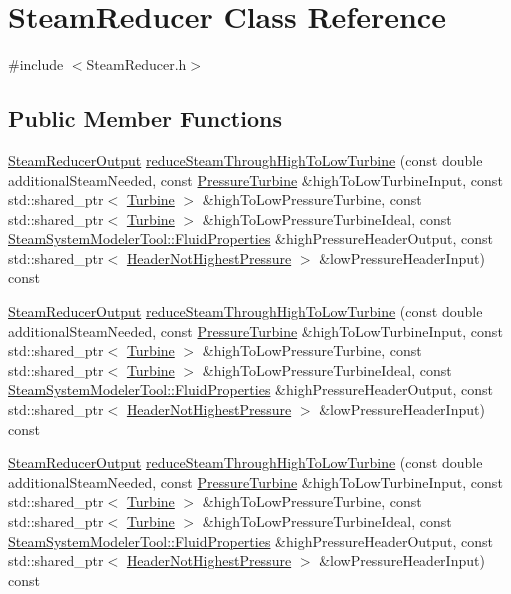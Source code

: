 \hypertarget{class_steam_reducer}{}\section{Steam\+Reducer Class Reference}
\label{class_steam_reducer}


{\ttfamily \#include $<$Steam\+Reducer.\+h$>$}

\subsection*{Public Member Functions}
\begin{DoxyCompactItemize}
\item 
\hyperlink{class_steam_reducer_output}{Steam\+Reducer\+Output} \hyperlink{class_steam_reducer_a87ac83f6821db20e9908ee03b18c81b4}{reduce\+Steam\+Through\+High\+To\+Low\+Turbine} (const double additional\+Steam\+Needed, const \hyperlink{class_pressure_turbine}{Pressure\+Turbine} \&high\+To\+Low\+Turbine\+Input, const std\+::shared\+\_\+ptr$<$ \hyperlink{class_turbine}{Turbine} $>$ \&high\+To\+Low\+Pressure\+Turbine, const std\+::shared\+\_\+ptr$<$ \hyperlink{class_turbine}{Turbine} $>$ \&high\+To\+Low\+Pressure\+Turbine\+Ideal, const \hyperlink{struct_steam_system_modeler_tool_1_1_fluid_properties}{Steam\+System\+Modeler\+Tool\+::\+Fluid\+Properties} \&high\+Pressure\+Header\+Output, const std\+::shared\+\_\+ptr$<$ \hyperlink{class_header_not_highest_pressure}{Header\+Not\+Highest\+Pressure} $>$ \&low\+Pressure\+Header\+Input) const
\item 
\hyperlink{class_steam_reducer_output}{Steam\+Reducer\+Output} \hyperlink{class_steam_reducer_a87ac83f6821db20e9908ee03b18c81b4}{reduce\+Steam\+Through\+High\+To\+Low\+Turbine} (const double additional\+Steam\+Needed, const \hyperlink{class_pressure_turbine}{Pressure\+Turbine} \&high\+To\+Low\+Turbine\+Input, const std\+::shared\+\_\+ptr$<$ \hyperlink{class_turbine}{Turbine} $>$ \&high\+To\+Low\+Pressure\+Turbine, const std\+::shared\+\_\+ptr$<$ \hyperlink{class_turbine}{Turbine} $>$ \&high\+To\+Low\+Pressure\+Turbine\+Ideal, const \hyperlink{struct_steam_system_modeler_tool_1_1_fluid_properties}{Steam\+System\+Modeler\+Tool\+::\+Fluid\+Properties} \&high\+Pressure\+Header\+Output, const std\+::shared\+\_\+ptr$<$ \hyperlink{class_header_not_highest_pressure}{Header\+Not\+Highest\+Pressure} $>$ \&low\+Pressure\+Header\+Input) const
\item 
\hyperlink{class_steam_reducer_output}{Steam\+Reducer\+Output} \hyperlink{class_steam_reducer_a87ac83f6821db20e9908ee03b18c81b4}{reduce\+Steam\+Through\+High\+To\+Low\+Turbine} (const double additional\+Steam\+Needed, const \hyperlink{class_pressure_turbine}{Pressure\+Turbine} \&high\+To\+Low\+Turbine\+Input, const std\+::shared\+\_\+ptr$<$ \hyperlink{class_turbine}{Turbine} $>$ \&high\+To\+Low\+Pressure\+Turbine, const std\+::shared\+\_\+ptr$<$ \hyperlink{class_turbine}{Turbine} $>$ \&high\+To\+Low\+Pressure\+Turbine\+Ideal, const \hyperlink{struct_steam_system_modeler_tool_1_1_fluid_properties}{Steam\+System\+Modeler\+Tool\+::\+Fluid\+Properties} \&high\+Pressure\+Header\+Output, const std\+::shared\+\_\+ptr$<$ \hyperlink{class_header_not_highest_pressure}{Header\+Not\+Highest\+Pressure} $>$ \&low\+Pressure\+Header\+Input) const

\end{DoxyCompactItemize}
